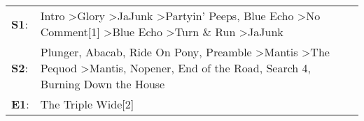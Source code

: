 \begin{supertabular}{p{0.03\textwidth}p{0.92\textwidth}}
 \textbf{S1}:  &                                         Intro\textsuperscript{} \textgreater \enspace Glory\textsuperscript{} \textgreater \enspace JaJunk\textsuperscript{} \textgreater \enspace Partyin' Peeps\textsuperscript{}, \enspace Blue Echo\textsuperscript{} \textgreater \enspace No Comment[1]\textsuperscript{} \textgreater \enspace Blue Echo\textsuperscript{} \textgreater \enspace Turn \& Run\textsuperscript{} \textgreater \enspace JaJunk\textsuperscript{}  \enspace  \\
 \textbf{S2}:  &  Plunger\textsuperscript{}, \enspace Abacab\textsuperscript{}, \enspace Ride On Pony\textsuperscript{}, \enspace Preamble\textsuperscript{} \textgreater \enspace Mantis\textsuperscript{} \textgreater \enspace The Pequod\textsuperscript{} \textgreater \enspace Mantis\textsuperscript{}, \enspace Nopener\textsuperscript{}, \enspace End of the Road\textsuperscript{}, \enspace Search 4\textsuperscript{}, \enspace Burning Down the House\textsuperscript{}  \enspace  \\
 \textbf{E1}:  &                                                                                                                                                                                                                                                                                                                                                                                                                                 The Triple Wide[2]\textsuperscript{}  \enspace  \\
\end{supertabular}
